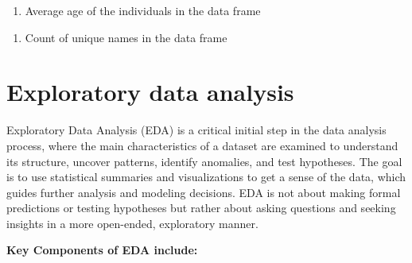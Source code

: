 \documentclass[
]{book}
\newenvironment{Shaded}{\begin{snugshade}}{\end{snugshade}}
\newcommand{\CommentTok}[1]{\textcolor[rgb]{0.56,0.35,0.01}{\textit{#1}}}
\newcommand{\FunctionTok}[1]{\textcolor[rgb]{0.13,0.29,0.53}{\textbf{#1}}}
\newcommand{\NormalTok}[1]{#1}
\newcommand{\OtherTok}[1]{\textcolor[rgb]{0.56,0.35,0.01}{#1}}
\newcommand{\SpecialCharTok}[1]{\textcolor[rgb]{0.81,0.36,0.00}{\textbf{#1}}}
\providecommand{\tightlist}{%
  \setlength{\itemsep}{0pt}\setlength{\parskip}{0pt}}
\begin{document}
\begin{enumerate}
\def\labelenumi{\arabic{enumi}.}
\setcounter{enumi}{2}
\tightlist
\item
  Average age of the individuals in the data frame
\end{enumerate}

\begin{Shaded}
\end{Shaded}

\begin{enumerate}
\def\labelenumi{\arabic{enumi}.}
\setcounter{enumi}{3}
\tightlist
\item
  Count of unique names in the data frame
\end{enumerate}

\begin{Shaded}
\end{Shaded}

\section*{Exploratory data analysis}\label{exploratory-data-analysis}

Exploratory Data Analysis (EDA) is a critical initial step in the data analysis process, where the main characteristics of a dataset are examined to understand its structure, uncover patterns, identify anomalies, and test hypotheses. The goal is to use statistical summaries and visualizations to get a sense of the data, which guides further analysis and modeling decisions. EDA is not about making formal predictions or testing hypotheses but rather about asking questions and seeking insights in a more open-ended, exploratory manner.

\textbf{Key Components of EDA include:}
\end{document}
